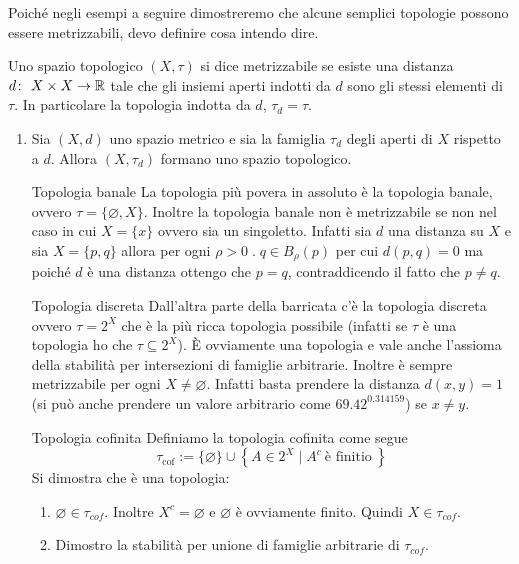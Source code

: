 Poiché negli esempi a seguire dimostreremo che alcune semplici topologie possono essere metrizzabili, devo definire cosa intendo dire.
\begin{definition}
	Uno spazio topologico $(X,\tau)$ si dice metrizzabile se esiste una distanza $d \colon\ X\times X \rightarrow \mathbb{R}$ tale che gli insiemi aperti indotti da $d$ sono gli stessi elementi di $\tau$. In particolare la topologia indotta da $d$, $\tau_d  = \tau$. 
\end{definition}

\begin{example}
\begin{enumerate}
	\item Sia $(X,d)$ uno spazio metrico e sia la famiglia $\tau_d$ degli aperti di $X$ rispetto a $d$. Allora $(X,\tau_d)$ formano uno spazio topologico. 
	\item[Topologia banale] La topologia più povera in assoluto è la topologia banale, ovvero $\tau = \{\varnothing, X\}$. Inoltre la topologia banale non è metrizzabile se non nel caso in cui $X = \{x\}$ ovvero sia un singoletto. Infatti sia $d$ una distanza su $X$ e sia $X = \{p,q\}$ allora per ogni $\rho > 0 \; . \; q \in B_\rho(p)$ per cui $d(p,q) = 0$ ma poiché $d$ è una distanza ottengo che $p=q$, contraddicendo il fatto che $p \neq q$. 
	\item[Topologia discreta] Dall'altra parte della barricata c'è la topologia discreta ovvero $\tau = 2^X$ che è la più ricca topologia possibile (infatti se $\tau$ è una topologia ho che $\tau \subseteq 2^X$). È ovviamente una topologia e vale anche l'assioma della stabilità per intersezioni di famiglie arbitrarie. Inoltre è sempre metrizzabile per ogni $X \neq \varnothing$. Infatti basta prendere la distanza $d(x,y) = 1$ (si può anche prendere un valore arbitrario come $69.42^{0.314159}$) se $x \neq y$.
	\item[Topologia cofinita] Definiamo la topologia cofinita come segue 
	\begin{equation}
		\tau_{\text{cof}} := \{\varnothing\} \cup \left\{ A \in 2^X  \mid A^c\ \text{è finitio}\ \right\}
	\end{equation}
	Si dimostra che è una topologia:
	\begin{enumerate}
		\item $\varnothing \in \tau_{cof}$. Inoltre $X^c = \varnothing$ e $\varnothing$ è ovviamente finito. Quindi $X \in \tau_{cof}$.
		\item Dimostro la stabilità per unione di famiglie arbitrarie di $\tau_{cof}$.
			\begin{equation}

\end{equation}
\end{enumerate}
\end{enumerate}
\end{example}
